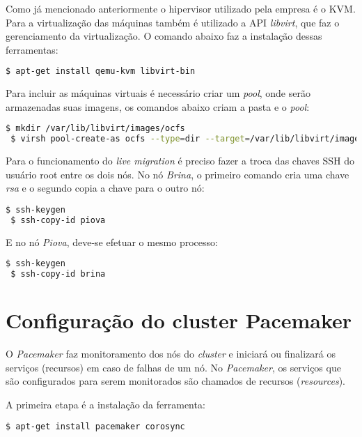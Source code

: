 Como já mencionado anteriormente o hipervisor utilizado pela empresa é o \ac{KVM}. Para a virtualização das máquinas também é utilizado a 
\ac{API} \textit{libvirt}, que faz o gerenciamento da virtualização. O comando abaixo faz a instalação dessas ferramentas:
\begin{lstlisting}[language=bash]
 $ apt-get install qemu-kvm libvirt-bin
\end{lstlisting}

Para incluir as máquinas virtuais é necessário criar um \textit{pool}, onde serão armazenadas suas imagens, os comandos abaixo criam a pasta
e o \textit{pool}:
\begin{lstlisting}[language=bash]
 $ mkdir /var/lib/libvirt/images/ocfs
 $ virsh pool-create-as ocfs --type=dir --target=/var/lib/libvirt/images/ocfs
\end{lstlisting}

Para o funcionamento do \textit{live migration} é preciso fazer a troca das chaves \ac{SSH} do usuário root entre os dois nós.
No nó \textit{Brina}, o primeiro comando cria uma chave \textit{rsa} e o segundo copia a chave para o outro nó:
\begin{lstlisting}[language=bash]
 $ ssh-keygen
 $ ssh-copy-id piova
\end{lstlisting}

E no nó \textit{Piova}, deve-se efetuar o mesmo processo:
\begin{lstlisting}[language=bash]
 $ ssh-keygen
 $ ssh-copy-id brina
\end{lstlisting}

\section{Configuração do cluster Pacemaker}
\label{ap:confpacemaker}

O \textit{Pacemaker} faz monitoramento dos nós do \textit{cluster} e iniciará ou finalizará os serviços (recursos) em caso de falhas de um nó.
No \textit{Pacemaker}, os serviços que são configurados para serem monitorados são chamados de recursos (\textit{resources}).

A primeira etapa é a instalação da ferramenta:
\begin{lstlisting}[language=bash]
 $ apt-get install pacemaker corosync
\end{lstlisting}

